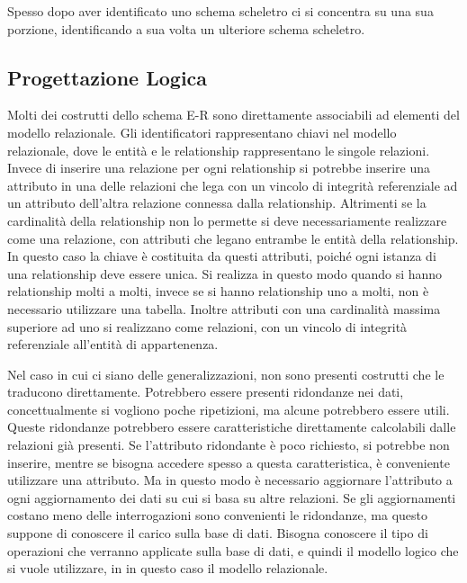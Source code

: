 \documentclass{article}
\numberwithin{equation}{subsection}
\begin{document}
Spesso dopo aver identificato uno schema scheletro ci si concentra su una sua porzione, identificando a sua volta un ulteriore schema scheletro. 


\subsection{Progettazione Logica}



Molti dei costrutti dello schema E-R sono direttamente associabili ad elementi del modello relazionale. 
Gli identificatori rappresentano chiavi nel modello relazionale, dove le entità e le relationship rappresentano le singole relazioni. Invece di inserire una relazione per 
ogni relationship si potrebbe inserire una attributo in una delle relazioni che lega con un vincolo di integrità referenziale ad un attributo dell'altra relazione connessa 
dalla relationship. Altrimenti se la cardinalità della relationship non lo permette si deve necessariamente realizzare come una relazione, con attributi che legano entrambe 
le entità della relationship. In questo caso la chiave è costituita da questi attributi, poiché ogni istanza di una relationship deve essere unica. Si realizza in questo 
modo quando si hanno relationship molti a molti, invece se si hanno relationship uno a molti, non è necessario utilizzare una tabella. 
Inoltre attributi con una cardinalità massima superiore ad uno si realizzano come relazioni, con un vincolo di integrità referenziale all'entità di appartenenza. 


Nel caso in cui ci siano delle generalizzazioni, non sono presenti costrutti che le traducono direttamente. %
Potrebbero essere presenti ridondanze nei dati, concettualmente si vogliono poche ripetizioni, ma alcune potrebbero essere utili. Queste ridondanze potrebbero essere 
caratteristiche direttamente calcolabili dalle relazioni già presenti. Se l'attributo ridondante è poco richiesto, si potrebbe non inserire, mentre se bisogna 
accedere spesso a questa caratteristica, è conveniente utilizzare una attributo. Ma in questo modo è necessario aggiornare l'attributo a ogni aggiornamento dei dati 
su cui si basa su altre relazioni. Se gli aggiornamenti costano meno delle interrogazioni sono convenienti le ridondanze, ma questo suppone di conoscere il carico sulla 
base di dati. Bisogna conoscere il tipo di operazioni che verranno applicate sulla base di dati, e quindi il modello logico che si vuole utilizzare, in in questo caso 
il modello relazionale. 
\end{document}
